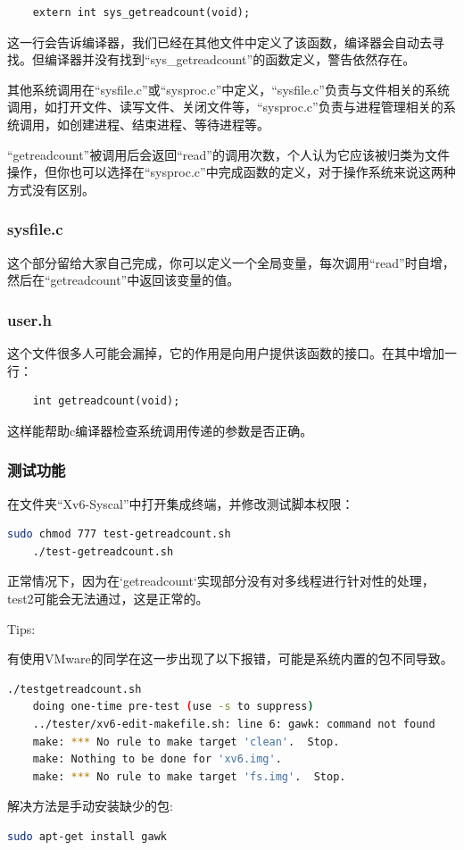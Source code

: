 \documentclass[fontset=ubuntu]{ctexart}
\begin{document}
\begin{lstlisting}
    extern int sys_getreadcount(void);
\end{lstlisting}

这一行会告诉编译器，我们已经在其他文件中定义了该函数，编译器会自动去寻找。但编译器并没有找到“sys\_getreadcount”的函数定义，警告依然存在。

其他系统调用在“sysfile.c”或“sysproc.c”中定义，“sysfile.c”负责与文件相关的系统调用，如打开文件、读写文件、关闭文件等，“sysproc.c”负责与进程管理相关的系统调用，如创建进程、结束进程、等待进程等。

“getreadcount”被调用后会返回“read”的调用次数，个人认为它应该被归类为文件操作，但你也可以选择在“sysproc.c”中完成函数的定义，对于操作系统来说这两种方式没有区别。

\subsubsection{sysfile.c}

这个部分留给大家自己完成，你可以定义一个全局变量，每次调用“read”时自增，然后在“getreadcount”中返回该变量的值。

\subsubsection{user.h}

这个文件很多人可能会漏掉，它的作用是向用户提供该函数的接口。在其中增加一行：

\begin{lstlisting}
    int getreadcount(void);
\end{lstlisting}

这样能帮助c编译器检查系统调用传递的参数是否正确。

\subsubsection{测试功能}

在文件夹“Xv6-Syscal”中打开集成终端，并修改测试脚本权限：

\begin{lstlisting}[language=bash]
    sudo chmod 777 test-getreadcount.sh
    ./test-getreadcount.sh
\end{lstlisting}

正常情况下，因为在`getreadcount`实现部分没有对多线程进行针对性的处理，test2可能会无法通过，这是正常的。

\noindent Tips:

有使用VMware的同学在这一步出现了以下报错，可能是系统内置的包不同导致。
\begin{lstlisting}[language=bash]
    ./testgetreadcount.sh
    doing one-time pre-test (use -s to suppress)
    ../tester/xv6-edit-makefile.sh: line 6: gawk: command not found
    make: *** No rule to make target 'clean'.  Stop.
    make: Nothing to be done for 'xv6.img'.
    make: *** No rule to make target 'fs.img'.  Stop.
\end{lstlisting}

解决方法是手动安装缺少的包:
\begin{lstlisting}[language=bash]
    sudo apt-get install gawk
\end{lstlisting}


\newpage
\printbibliography{}
\end{document}
